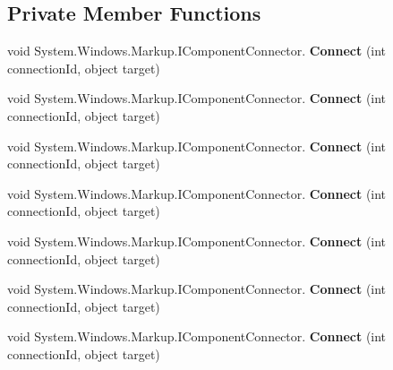 \subsection*{Private Member Functions}
\begin{DoxyCompactItemize}
\item 
\mbox{\label{class_teacher_handbook_1_1_plugins_1_1_feed_1_1_feed_a46057408648aa7e05ed3c54cb0a1cf56}} 
void System.\+Windows.\+Markup.\+I\+Component\+Connector. {\bfseries Connect} (int connection\+Id, object target)
\item 
\mbox{\label{class_teacher_handbook_1_1_plugins_1_1_feed_1_1_feed_a46057408648aa7e05ed3c54cb0a1cf56}} 
void System.\+Windows.\+Markup.\+I\+Component\+Connector. {\bfseries Connect} (int connection\+Id, object target)
\item 
\mbox{\label{class_teacher_handbook_1_1_plugins_1_1_feed_1_1_feed_a46057408648aa7e05ed3c54cb0a1cf56}} 
void System.\+Windows.\+Markup.\+I\+Component\+Connector. {\bfseries Connect} (int connection\+Id, object target)
\item 
\mbox{\label{class_teacher_handbook_1_1_plugins_1_1_feed_1_1_feed_a46057408648aa7e05ed3c54cb0a1cf56}} 
void System.\+Windows.\+Markup.\+I\+Component\+Connector. {\bfseries Connect} (int connection\+Id, object target)
\item 
\mbox{\label{class_teacher_handbook_1_1_plugins_1_1_feed_1_1_feed_a46057408648aa7e05ed3c54cb0a1cf56}} 
void System.\+Windows.\+Markup.\+I\+Component\+Connector. {\bfseries Connect} (int connection\+Id, object target)
\item 
\mbox{\label{class_teacher_handbook_1_1_plugins_1_1_feed_1_1_feed_a46057408648aa7e05ed3c54cb0a1cf56}} 
void System.\+Windows.\+Markup.\+I\+Component\+Connector. {\bfseries Connect} (int connection\+Id, object target)
\item 
\mbox{\label{class_teacher_handbook_1_1_plugins_1_1_feed_1_1_feed_a46057408648aa7e05ed3c54cb0a1cf56}} 
void System.\+Windows.\+Markup.\+I\+Component\+Connector. {\bfseries Connect} (int connection\+Id, object target)
\end{DoxyCompactItemize}
